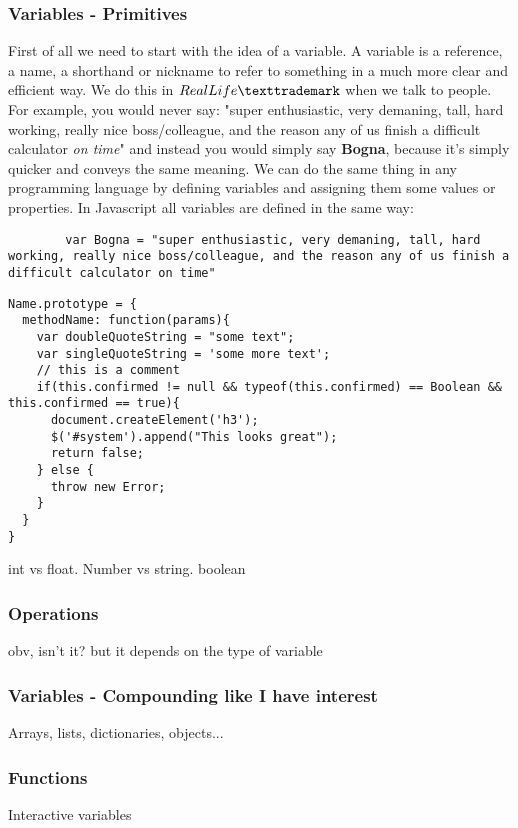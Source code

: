     \subsubsection{Variables - Primitives}
    \label{subsub:primitives}
    First of all we need to start with the idea of a variable. A variable is a reference, a name, a shorthand or nickname to refer to something in a much more clear and efficient way.  We do this in $Real Life\texttrademark$  when we talk to people. For example, you would never say: "super enthusiastic, very demaning, tall, hard working, really nice boss/colleague, and the reason any of us finish a difficult calculator \textit{on time}" and instead you would simply say \textbf{Bogna}, because it's simply quicker and conveys the same meaning.
    We can do the same thing in any programming language by defining variables and assigning them some values or properties. In Javascript all variables are defined in the same way:
    \begin{lstlisting}
        var Bogna = "super enthusiastic, very demaning, tall, hard working, really nice boss/colleague, and the reason any of us finish a difficult calculator on time"
    \end{lstlisting}

    \medskip
\begin{lstlisting}[caption=My Javascript Example]
Name.prototype = {
  methodName: function(params){
    var doubleQuoteString = "some text";
    var singleQuoteString = 'some more text';
    // this is a comment
    if(this.confirmed != null && typeof(this.confirmed) == Boolean && this.confirmed == true){
      document.createElement('h3');
      $('#system').append("This looks great");
      return false;
    } else {
      throw new Error;
    }
  }
}
\end{lstlisting}
int vs float. Number vs string. boolean
    \subsubsection{Operations}
    \label{subsub:operations}
obv, isn't it? but it depends on the type of variable
    \subsubsection{Variables - Compounding like I have interest} 
    \label{subsub:array}
Arrays, lists, dictionaries, objects...
    \subsubsection{Functions}
    \label{subsub:functions}
Interactive variables

